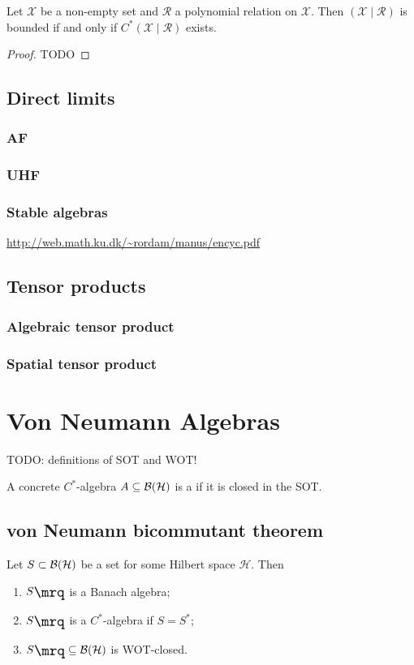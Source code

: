\begin{proposition}
Let $\mathcal{X}$ be a non-empty set and $\mathcal{R}$ a polynomial relation on $\mathcal{X}$. Then $(\mathcal{X}\;|\; \mathcal{R})$ is bounded if and only if $C^*(\mathcal{X}\;|\;\mathcal{R})$ exists.
\end{proposition}
\begin{proof}
TODO
\end{proof}

\section{Direct limits}
\subsection{AF}
\subsection{UHF}
\subsection{Stable algebras}
\url{http://web.math.ku.dk/~rordam/manus/encyc.pdf}

\section{Tensor products}
\subsection{Algebraic tensor product}
\subsection{Spatial tensor product}

\chapter{Von Neumann Algebras}
TODO: definitions of SOT and WOT!
\begin{definition}
A concrete $C^*$-algebra $A\subseteq \operatorname{\mathcal{B}}(\mathcal{H})$ is a  if it is closed in the SOT.
\end{definition}

\section{von Neumann bicommutant theorem}
\begin{proposition}
Let $S\subset \operatorname{\mathcal{B}}(\mathcal{H})$ be a set for some Hilbert space $\mathcal{H}$. Then
\begin{enumerate}
\item $\comm{S}$ is a Banach algebra;
\item $\comm{S}$ is a $C^*$-algebra if $S = S^*$;
\item $\comm{S}\subseteq \Bounded(\mathcal{H})$ is WOT-closed.
\end{enumerate}
\end{proposition}

